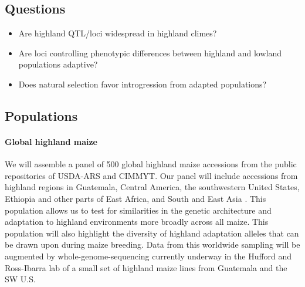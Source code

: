 \subsection*{Questions}
\begin{itemize}[topsep=0pt,itemsep=-1ex,partopsep=1ex,parsep=1ex]
\item Are highland QTL/loci widespread in highland climes?
\item Are loci controlling phenotypic differences between highland and lowland populations adaptive?
\item Does natural selection favor introgression from adapted populations?
\end{itemize}

\subsection{Populations}

\paragraph{Global highland maize} 
We will assemble a panel of 500 global highland maize accessions from the public repositories of USDA-ARS and CIMMYT.  Our panel will include accessions from highland regions in Guatemala, Central America, the southwestern United States, Ethiopia and other parts of East Africa, and South and East Asia \citep{bjarnason1994subtropical}. This population allows us to test for similarities in the genetic architecture and adaptation to highland environments more broadly across all maize.  This population will also highlight the diversity of highland adaptation alleles that can be drawn upon during maize breeding.  Data from this worldwide sampling will be augmented by whole-genome-sequencing currently underway in the Hufford and Ross-Ibarra lab of a small set of highland maize lines from Guatemala and the SW U.S.

